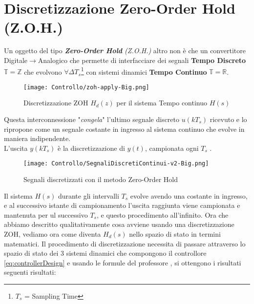 \newpage
\section{Discretizzazione Zero-Order Hold (Z.O.H.)}
Un oggetto del tipo \textit{\textbf{Zero-Order Hold} (Z.O.H.)} altro non è che un convertitore Digitale$ \rightarrow $Analogico che permette di interfacciare dei segnali \textbf{Tempo Discreto} $\mathbb{T} =  \mathbb{Z} $ che evolvono $\forall \Delta T_s $\footnote{$ T_s $ = Sampling Time} con sistemi dinamici \textbf{Tempo Continuo} $\mathbb{T} =  \mathbb{R} $.\vspace{-2mm}
\begin{figure}[H]
	\centering
	\caption[Discretizzazione Zero-Order Hold  $ H_d(z) $ del sistema Tempo continuo $ H(s) $]{Discretizzazione ZOH $ H_d(z) $ per il sistema Tempo continuo $ H(s) $}\vspace{4mm}
	\texttt{[image: Controllo/zoh-apply-Big.png]}
\end{figure}\vspace{-6mm}
\noindent
Questa interconnessione "\textit{congela}" l'ultimo segnale discreto $ u(k T_s) $ ricevuto e lo ripropone come un segnale costante in ingresso al sistema continuo che evolve in maniera indipendente.\\
L'uscita $ y(k T_s) $ è la discretizzazione di $ y(t) $, campionata ogni $ T_s $ .
\begin{figure}[H]\vspace{-3mm}
	\centering
	\caption[Effetto sui segnali discretizzati con il metodo Zero-Order Hold]{Segnali discretizzati con il metodo Zero-Order Hold}\vspace{2mm}
	\texttt{[image: Controllo/SegnaliDiscretiContinui-v2-Big.png]}
\end{figure}
\noindent
Il sistema $ H(s) $ durante gli intervalli $ T_s $  evolve avendo una costante in ingresso, e al successivo istante di campionamento l'uscita raggiunta viene campionata e mantenuta per ul successivo $ T_s $, e questo procedimento all'infinito.
\newpage
\noindent
Ora che abbiamo descritto qualitativamente cosa avviene usando una discretizzazione ZOH, vediamo ora come diventa $ H_d(s) $ nello spazio di stato in termini matematici. Il procedimento di discretizzazione necessita di passare attraverso lo spazio di stato dei 3 sistemi dinamici che compongono il controllore \ref{eq:controllerDesign} e usando le formule del professore \cite{Discretizzazione}, si ottengono i risultati seguenti risultati:
